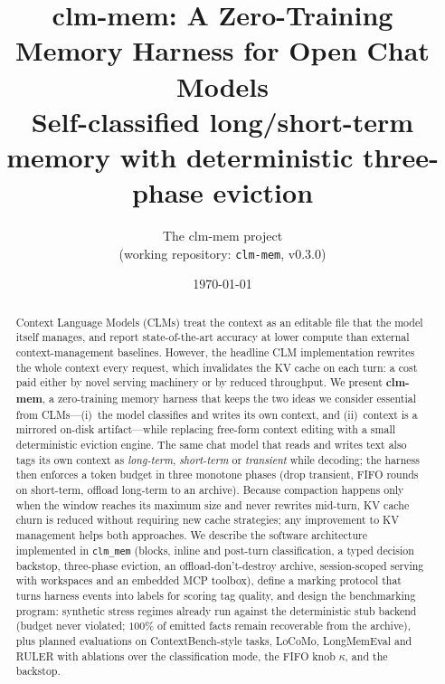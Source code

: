 \documentclass[10pt]{article}
\title{\textbf{clm-mem: A Zero-Training Memory Harness for Open Chat Models}\\[6pt]
\large Self-classified long/short-term memory with deterministic three-phase eviction}
\author{The clm-mem project\\ \small (working repository: \texttt{clm-mem}, v0.3.0)}
\date{\today}
\begin{document}
\maketitle
\begin{abstract}
\noindent
Context Language Models (CLMs) treat the context as an editable file that the model itself manages, and report state-of-the-art accuracy at lower compute than external context-management baselines. However, the headline CLM implementation rewrites the whole context every request, which invalidates the KV cache on each turn: a cost paid either by novel serving machinery or by reduced throughput.
We present \textbf{clm-mem}, a zero-training memory harness that keeps the two ideas we consider essential from CLMs---(i)~the model classifies and writes its own context, and (ii)~context is a mirrored on-disk artifact---while replacing free-form context editing with a small deterministic eviction engine.
The same chat model that reads and writes text also tags its own context as \emph{long-term}, \emph{short-term} or \emph{transient} while decoding; the harness then enforces a token budget in three monotone phases (drop transient, FIFO rounds on short-term, offload long-term to an archive).
Because compaction happens only when the window reaches its maximum size and never rewrites mid-turn, KV cache churn is reduced without requiring new cache strategies; any improvement to KV management helps both approaches.
We describe the software architecture implemented in \texttt{clm\_mem} (blocks, inline and post-turn classification, a typed decision backstop, three-phase eviction, an offload-don't-destroy archive, session-scoped serving with workspaces and an embedded MCP toolbox), define a marking protocol that turns harness events into labels for scoring tag quality, and design the benchmarking program: synthetic stress regimes already run against the deterministic stub backend (budget never violated; $100\%$ of emitted facts remain recoverable from the archive), plus planned evaluations on ContextBench-style tasks, LoCoMo, LongMemEval and RULER with ablations over the classification mode, the FIFO knob $\kappa$, and the backstop.
\end{abstract}
\newpage
\end{document}
